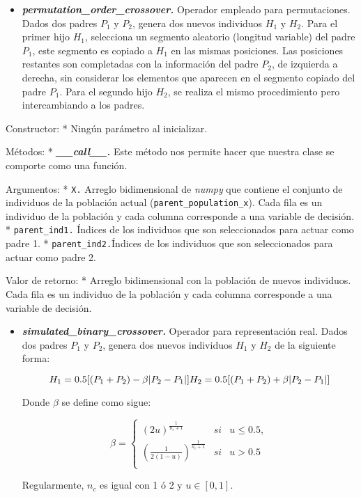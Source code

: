 \documentclass[11pt]{article}
\providecommand{\tightlist}{%
      \setlength{\itemsep}{0pt}\setlength{\parskip}{0pt}}
\begin{document}
    \begin{itemize}
\tightlist
\item
  \emph{\textbf{permutation\_order\_crossover.}} Operador empleado para
  permutaciones. Dados dos padres \(P_1\) y \(P_2\), genera dos nuevos
  individuos \(H_1\) y \(H_2\). Para el primer hijo \(H_1\), selecciona
  un segmento aleatorio (longitud variable) del padre \(P_1\), este
  segmento es copiado a \(H_1\) en las mismas posiciones. Las posiciones
  restantes son completadas con la información del padre \(P_2\), de
  izquierda a derecha, sin considerar los elementos que aparecen en el
  segmento copiado del padre \(P_1\). Para el segundo hijo \(H_2\), se
  realiza el mismo procedimiento pero intercambiando a los padres.
\end{itemize}

Constructor: * Ningún parámetro al inicializar.

Métodos: * \emph{\textbf{\_\_call\_\_.}} Este método nos permite hacer
que nuestra clase se comporte como una función.

Argumentos: * \texttt{X.} Arreglo bidimensional de \emph{numpy} que
contiene el conjunto de individuos de la población actual
(\texttt{parent\_population\_x}). Cada fila es un individuo de la
población y cada columna corresponde a una variable de decisión. *
\texttt{parent\_ind1.} Índices de los individuos que son seleccionados
para actuar como padre 1. * \texttt{parent\_ind2.}Índices de los
individuos que son seleccionados para actuar como padre 2.

Valor de retorno: * Arreglo bidimensional con la población de nuevos
individuos. Cada fila es un individuo de la población y cada columna
corresponde a una variable de decisión.

    \begin{itemize}
\tightlist
\item
  \emph{\textbf{simulated\_binary\_crossover.}} Operador para
  representación real. Dados dos padres \(P_1\) y \(P_2\), genera dos
  nuevos individuos \(H_1\) y \(H_2\) de la siguiente forma:

  \begin{equation}
  H_1 = 0.5 [(P_1 + P_2) - \beta | P_2 - P_1 |]\\
  H_2 = 0.5 [(P_1 + P_2) + \beta | P_2 - P_1 |]\\
  \end{equation}

  Donde \(\beta\) se define como sigue:

  \begin{equation}
  \beta =
    \begin{cases}
     (2u)^{\frac{1}{n_{c}+1}} & si & u \le 0.5,\\
     \left(\frac{1}{2(1-u)}\right)^{\frac{1}{n_{c}+1}} & si & u > 0.5 \\
    \end{cases}
  \end{equation}

  Regularmente, \(n_{c}\) es igual con 1 ó 2 y \(u \in [0,1]\).
\end{itemize}
\end{document}
